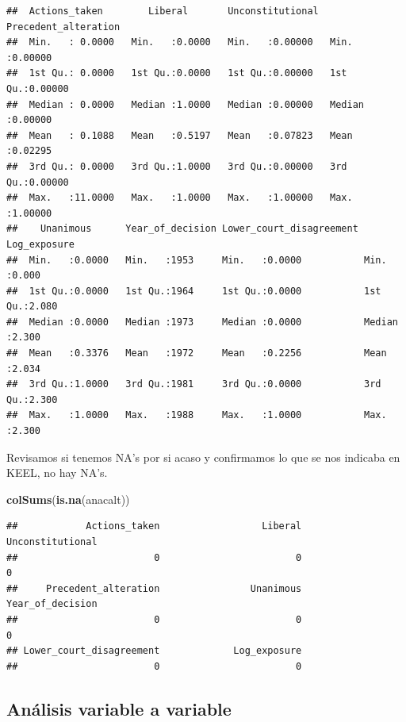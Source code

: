 \documentclass[
]{article}
\newenvironment{Shaded}{\begin{snugshade}}{\end{snugshade}}
\newcommand{\FunctionTok}[1]{\textcolor[rgb]{0.13,0.29,0.53}{\textbf{#1}}}
\newcommand{\NormalTok}[1]{#1}
\begin{document}
\begin{verbatim}
##  Actions_taken        Liberal       Unconstitutional  Precedent_alteration
##  Min.   : 0.0000   Min.   :0.0000   Min.   :0.00000   Min.   :0.00000     
##  1st Qu.: 0.0000   1st Qu.:0.0000   1st Qu.:0.00000   1st Qu.:0.00000     
##  Median : 0.0000   Median :1.0000   Median :0.00000   Median :0.00000     
##  Mean   : 0.1088   Mean   :0.5197   Mean   :0.07823   Mean   :0.02295     
##  3rd Qu.: 0.0000   3rd Qu.:1.0000   3rd Qu.:0.00000   3rd Qu.:0.00000     
##  Max.   :11.0000   Max.   :1.0000   Max.   :1.00000   Max.   :1.00000     
##    Unanimous      Year_of_decision Lower_court_disagreement  Log_exposure  
##  Min.   :0.0000   Min.   :1953     Min.   :0.0000           Min.   :0.000  
##  1st Qu.:0.0000   1st Qu.:1964     1st Qu.:0.0000           1st Qu.:2.080  
##  Median :0.0000   Median :1973     Median :0.0000           Median :2.300  
##  Mean   :0.3376   Mean   :1972     Mean   :0.2256           Mean   :2.034  
##  3rd Qu.:1.0000   3rd Qu.:1981     3rd Qu.:0.0000           3rd Qu.:2.300  
##  Max.   :1.0000   Max.   :1988     Max.   :1.0000           Max.   :2.300
\end{verbatim}

Revisamos si tenemos NA's por si acaso y confirmamos lo que se nos
indicaba en KEEL, no hay NA's.

\begin{Shaded}
\begin{Highlighting}[]
\FunctionTok{colSums}\NormalTok{(}\FunctionTok{is.na}\NormalTok{(anacalt))}
\end{Highlighting}
\end{Shaded}

\begin{verbatim}
##            Actions_taken                  Liberal         Unconstitutional 
##                        0                        0                        0 
##     Precedent_alteration                Unanimous         Year_of_decision 
##                        0                        0                        0 
## Lower_court_disagreement             Log_exposure 
##                        0                        0
\end{verbatim}

\hypertarget{anuxe1lisis-variable-a-variable}{%
\subsection{Análisis variable a
variable}\label{anuxe1lisis-variable-a-variable}}
\end{document}
